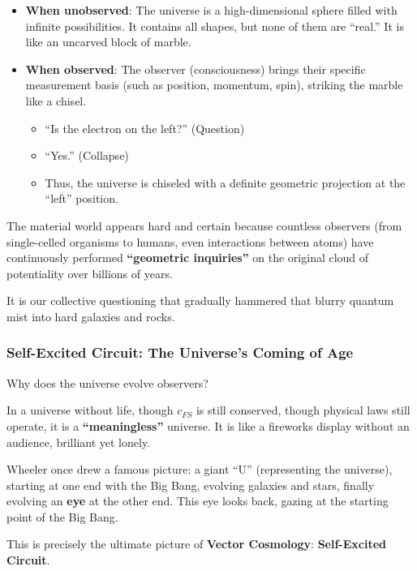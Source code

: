 \begin{itemize}
\item \textbf{When unobserved}: The universe is a high-dimensional sphere filled with infinite possibilities. It contains all shapes, but none of them are ``real.'' It is like an uncarved block of marble.

\item \textbf{When observed}: The observer (consciousness) brings their specific measurement basis (such as position, momentum, spin), striking the marble like a chisel.

    \begin{itemize}
    \item ``Is the electron on the left?'' (Question)

    \item ``Yes.'' (Collapse)

    \item Thus, the universe is chiseled with a definite geometric projection at the ``left'' position.
    \end{itemize}
\end{itemize}

The material world appears hard and certain because countless observers (from single-celled organisms to humans, even interactions between atoms) have continuously performed \textbf{``geometric inquiries''} on the original cloud of potentiality over billions of years.

It is our collective questioning that gradually hammered that blurry quantum mist into hard galaxies and rocks.

\subsubsection{Self-Excited Circuit: The Universe's Coming of Age}

Why does the universe evolve observers?

In a universe without life, though $c_{FS}$ is still conserved, though physical laws still operate, it is a \textbf{``meaningless''} universe. It is like a fireworks display without an audience, brilliant yet lonely.

Wheeler once drew a famous picture: a giant ``U'' (representing the universe), starting at one end with the Big Bang, evolving galaxies and stars, finally evolving an \textbf{eye} at the other end. This eye looks back, gazing at the starting point of the Big Bang.

This is precisely the ultimate picture of \textbf{Vector Cosmology}: \textbf{Self-Excited Circuit}.

